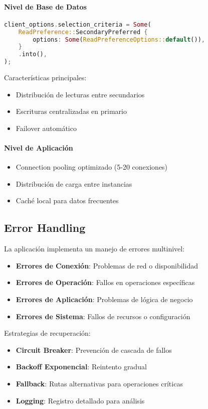 \documentclass[12pt,letterpaper]{article}
\begin{document}
\paragraph{Nivel de Base de Datos}
\begin{lstlisting}[language=rust]
client_options.selection_criteria = Some(
    ReadPreference::SecondaryPreferred {
        options: Some(ReadPreferenceOptions::default()),
    }
    .into(),
);
\end{lstlisting}

Características principales:
\begin{itemize}
    \item Distribución de lecturas entre secundarios
    \item Escrituras centralizadas en primario
    \item Failover automático
\end{itemize}

\paragraph{Nivel de Aplicación}
\begin{itemize}
    \item Connection pooling optimizado (5-20 conexiones)
    \item Distribución de carga entre instancias
    \item Caché local para datos frecuentes
\end{itemize}

\subsection{Error Handling}
La aplicación implementa un manejo de errores multinivel:

\begin{itemize}
    \item \textbf{Errores de Conexión}: Problemas de red o disponibilidad
    \item \textbf{Errores de Operación}: Fallos en operaciones específicas
    \item \textbf{Errores de Aplicación}: Problemas de lógica de negocio
    \item \textbf{Errores de Sistema}: Fallos de recursos o configuración
\end{itemize}

Estrategias de recuperación:
\begin{itemize}
    \item \textbf{Circuit Breaker}: Prevención de cascada de fallos
    \item \textbf{Backoff Exponencial}: Reintento gradual
    \item \textbf{Fallback}: Rutas alternativas para operaciones críticas
    \item \textbf{Logging}: Registro detallado para análisis
\end{itemize}
\end{document}
